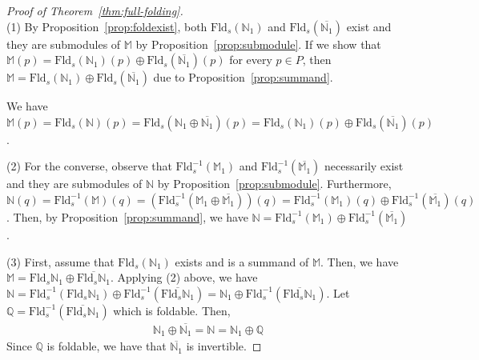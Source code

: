 \documentclass[11pt]{article}
\theoremstyle{plain}%
\newcommand{\N}{\mathbb{N}}
\newcommand{\M}{\mathbb{M}}
\newcommand{\Q}{\mathbb{Q}}
\newcommand{\Fld}{\mathrm{Fld}}
\begin{document}
\begin{proof}[Proof of Theorem~\ref{thm:full-folding}]
~\\
   (1) By Proposition~\ref{prop:foldexist}, both $\Fld_s(\N_1)$ and $\Fld_s(\overline{\N_1})$ exist and
    they are submodules of $\M$ by Proposition~\ref{prop:submodule}. If we show that
    $\M(p)=\Fld_s(\N_1)(p)\oplus \Fld_s(\overline{\N_1})(p)$ for every $p\in P$, then $\M=\Fld_s(\N_1)\oplus \Fld_s(\overline{\N_1})$ due to Proposition~\ref{prop:summand}.

    We have $\M(p)=\Fld_s(\N)(p)=\Fld_s(\N_1\oplus \overline{\N_1})(p)=\Fld_s(\N_1)(p)\oplus \Fld_s(\overline{\N_1})(p)$. 

   (2) For the converse, observe that $\Fld_s^{-1}(\M_1)$ and $\Fld_s^{-1}(\overline{\M_1})$ necessarily exist and they are submodules of $\N$ by Proposition~\ref{prop:submodule}. Furthermore, $\N(q)=\Fld_s^{-1}(\M)(q)=(\Fld_s^{-1}(\M_1\oplus \overline{\M_1}))(q)= \Fld_s^{-1}(\M_1)(q)\oplus \Fld_s^{-1}(\overline{\M_1})(q)$. Then, by Proposition~\ref{prop:summand}, we have $\N=\Fld_s^{-1}(\M_1)\oplus \Fld_s^{-1}(\overline{\M_1})$. 

   (3) First, assume that $\Fld_s(\N_1)$ exists and is a summand of $\M$.
   Then, we have $\M=\Fld_s \N_1\oplus \overline{\Fld_s \N_1}$. Applying
   (2) above, we have $\N=\Fld_s^{-1}(\Fld_s\N_1)\oplus \Fld_s^{-1}(\overline{\Fld_s \N_1})
   = \N_1\oplus \Fld_s^{-1}(\overline{\Fld_s \N_1})$. Let $\Q=\Fld_s^{-1}(\overline{\Fld_s \N_1})$ which is foldable. Then,
   \begin{eqnarray}
   \N_1\oplus \overline{\N_1}=\N=\N_1\oplus \Q
   \label{eq:nq}
   \end{eqnarray}
   Since
   $\mathbb{Q}$ is foldable, we have that $\overline{\N_1}$ is invertible.


\end{proof}
\end{document}
